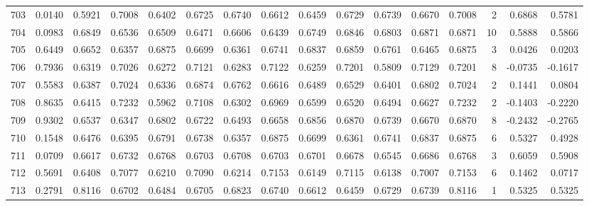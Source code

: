 \begin{tabular}{lrrrrrrrrrrrrrrr}
703 &      0.0140 &  0.5921 &  0.7008 &  0.6402 &  0.6725 &  0.6740 &  0.6612 &  0.6459 &  0.6729 &  0.6739 &   0.6670 &     0.7008 &      2 &                    0.6868 &                     0.5781 \\
704 &      0.0983 &  0.6849 &  0.6536 &  0.6509 &  0.6471 &  0.6606 &  0.6439 &  0.6749 &  0.6846 &  0.6803 &   0.6871 &     0.6871 &     10 &                    0.5888 &                     0.5866 \\
705 &      0.6449 &  0.6652 &  0.6357 &  0.6875 &  0.6699 &  0.6361 &  0.6741 &  0.6837 &  0.6859 &  0.6761 &   0.6465 &     0.6875 &      3 &                    0.0426 &                     0.0203 \\
706 &      0.7936 &  0.6319 &  0.7026 &  0.6272 &  0.7121 &  0.6283 &  0.7122 &  0.6259 &  0.7201 &  0.5809 &   0.7129 &     0.7201 &      8 &                   -0.0735 &                    -0.1617 \\
707 &      0.5583 &  0.6387 &  0.7024 &  0.6336 &  0.6874 &  0.6762 &  0.6616 &  0.6489 &  0.6529 &  0.6401 &   0.6802 &     0.7024 &      2 &                    0.1441 &                     0.0804 \\
708 &      0.8635 &  0.6415 &  0.7232 &  0.5962 &  0.7108 &  0.6302 &  0.6969 &  0.6599 &  0.6520 &  0.6494 &   0.6627 &     0.7232 &      2 &                   -0.1403 &                    -0.2220 \\
709 &      0.9302 &  0.6537 &  0.6347 &  0.6802 &  0.6722 &  0.6493 &  0.6658 &  0.6856 &  0.6870 &  0.6739 &   0.6670 &     0.6870 &      8 &                   -0.2432 &                    -0.2765 \\
710 &      0.1548 &  0.6476 &  0.6395 &  0.6791 &  0.6738 &  0.6357 &  0.6875 &  0.6699 &  0.6361 &  0.6741 &   0.6837 &     0.6875 &      6 &                    0.5327 &                     0.4928 \\
711 &      0.0709 &  0.6617 &  0.6732 &  0.6768 &  0.6703 &  0.6708 &  0.6703 &  0.6701 &  0.6678 &  0.6545 &   0.6686 &     0.6768 &      3 &                    0.6059 &                     0.5908 \\
712 &      0.5691 &  0.6408 &  0.7077 &  0.6210 &  0.7090 &  0.6214 &  0.7153 &  0.6149 &  0.7115 &  0.6138 &   0.7007 &     0.7153 &      6 &                    0.1462 &                     0.0717 \\
713 &      0.2791 &  0.8116 &  0.6702 &  0.6484 &  0.6705 &  0.6823 &  0.6740 &  0.6612 &  0.6459 &  0.6729 &   0.6739 &     0.8116 &      1 &                    0.5325 &                     0.5325 \\

\end{tabular}

